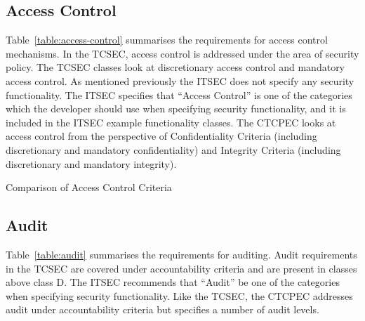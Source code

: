     \subsection{Access Control} 
    Table~\ref{table:access-control} summarises the requirements for access control
    mechanisms. In the TCSEC, access control is addressed under the area of security policy.
    The TCSEC classes look at discretionary access control and mandatory access control.
    As mentioned previously the ITSEC does not specify any security functionality.
    The ITSEC specifies that ``Access Control'' is one of the categories which the developer should
    use when specifying security functionality, and it is included in the ITSEC example functionality
    classes.
    The CTCPEC looks at access control from the perspective of Confidentiality Criteria (including
    discretionary and mandatory confidentiality) and Integrity Criteria (including
    discretionary and mandatory integrity).

    \begin{table}[H]
    \begin{center}
    \bc
    \ec
    \end{center}
    \caption{Comparison of Access Control Criteria} \label{table:access-control}
    \end{table}

    \subsection{Audit} 
    Table~\ref{table:audit} summarises the requirements for auditing. Audit requirements
    in the TCSEC are covered under accountability criteria and are present in classes
    above class D. The ITSEC recommends that ``Audit'' be one of the categories when
    specifying security functionality. Like the TCSEC, the CTCPEC addresses audit under
    accountability criteria but specifies a number of audit levels.

